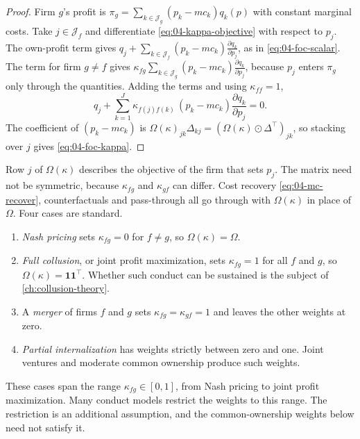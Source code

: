 \begin{proof}
Firm $g$'s profit is $\pi_g = \sum_{k \in \mathcal{J}_g}(p_k - mc_k)q_k(p)$ with constant marginal costs. Take
$j \in \mathcal{J}_f$ and differentiate \eqref{eq:04-kappa-objective} with respect to $p_j$. The own-profit term
gives $q_j + \sum_{k \in \mathcal{J}_f}(p_k - mc_k)\frac{\partial q_k}{\partial p_j}$, as in
\eqref{eq:04-foc-scalar}. The term for firm $g \neq f$ gives $\kappa_{fg}\sum_{k \in \mathcal{J}_g}(p_k -
mc_k)\frac{\partial q_k}{\partial p_j}$, because $p_j$ enters $\pi_g$ only through the quantities. Adding the terms
and using $\kappa_{ff} = 1$,
\begin{equation*}
q_j + \sum_{k = 1}^{J}\kappa_{f(j)f(k)}\,(p_k - mc_k)\frac{\partial q_k}{\partial p_j} = 0 .
\end{equation*}
The coefficient of $(p_k - mc_k)$ is $\Omega(\kappa)_{jk}\Delta_{kj} = (\Omega(\kappa) \odot \Delta^\top)_{jk}$, so
stacking over $j$ gives \eqref{eq:04-foc-kappa}.
\end{proof}

Row $j$ of $\Omega(\kappa)$ describes the objective of the firm that sets $p_j$. The matrix need not be
symmetric, because $\kappa_{fg}$ and $\kappa_{gf}$ can differ. Cost recovery \eqref{eq:04-mc-recover},
counterfactuals and pass-through all go through with $\Omega(\kappa)$ in place of $\Omega$. Four cases are
standard.
\begin{enumerate}
  \item \emph{Nash pricing} sets $\kappa_{fg} = 0$ for $f \neq g$, so $\Omega(\kappa) = \Omega$.
  \item \emph{Full collusion}, or joint profit maximization, sets $\kappa_{fg} = 1$ for all $f$ and $g$, so
  $\Omega(\kappa) = \mathbf{1}\mathbf{1}^\top$. Whether such conduct can be sustained is the subject of
  \cref{ch:collusion-theory}.
  \item A \emph{merger} of firms $f$ and $g$ sets $\kappa_{fg} = \kappa_{gf} = 1$ and leaves the other weights at
  zero.
  \item \emph{Partial internalization} has weights strictly between zero and one. Joint ventures and moderate
  common ownership produce such weights.
\end{enumerate}
These cases span the range $\kappa_{fg} \in [0, 1]$, from Nash pricing to joint profit maximization. Many conduct
models restrict the weights to this range. The restriction is an additional assumption, and the common-ownership
weights below need not satisfy it.

